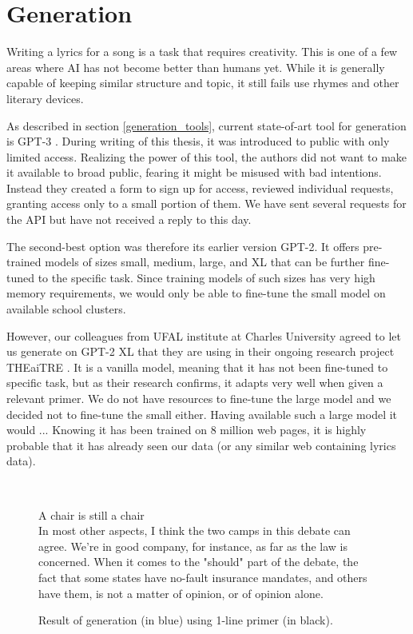 \chapter{Generation}
Writing a lyrics for a song is a task that requires creativity. This is one of a few areas where AI has not become better than humans yet. While it is generally capable of keeping similar structure and topic, it still fails use rhymes and other literary devices.

As described in section \ref{generation_tools}, current state-of-art tool for generation is GPT-3 \cite{brown2020language}. During writing of this thesis, it was introduced to public with only limited access. Realizing the power of this tool, the authors did not want to make it available to broad public, fearing it might be misused with bad intentions. Instead they created a form to sign up for access, reviewed individual requests, granting access only to a small portion of them. We have sent several requests for the API but have not received a reply to this day.

The second-best option was therefore its earlier version GPT-2. It offers pre-trained models of sizes small, medium, large, and XL that can be further fine-tuned to the specific task. Since training models of such sizes has very high memory requirements, we would only be able to fine-tune the small model on available school clusters. 

However, our colleagues from UFAL institute at Charles University agreed to let us generate on GPT-2 XL that they are using in their ongoing research project THEaiTRE \cite{rosa2021theaitre}. It is a vanilla model, meaning that it has not been fine-tuned to specific task, but as their research confirms, it adapts very well when given a relevant primer. We do not have resources to fine-tune the large model and we decided not to fine-tune the small either. Having available such a large model it would ... Knowing it has been trained on 8 million web pages, it is highly probable that it has already seen our data (or any similar web containing lyrics data). 

\
\begin{figure}[htb]\centering
	A chair is still a chair \\
	\color{blue}In most other aspects, I think the two camps in this debate can agree. We're in good company, for instance, as far as the law is concerned. When it comes to the "should" part of the debate, the fact that some states have no-fault insurance mandates, and others have them, is not a matter of opinion, or of opinion alone. \\
	\endminipage\hfill
	\caption{Result of generation (in blue) using 1-line primer (in black).} \label{fig_1line_primer}
\end{figure} 





